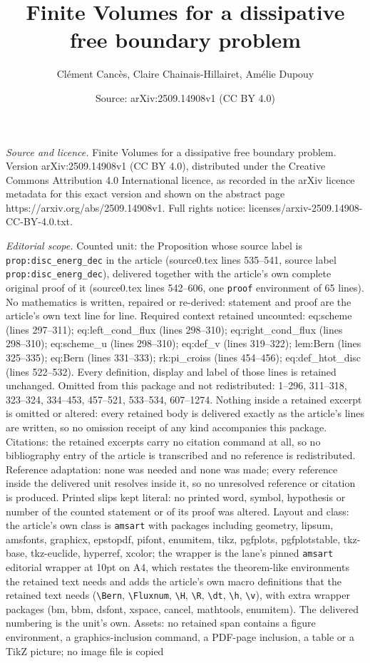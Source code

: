 \documentclass[10pt,a4paper]{amsart}
\title[Finite Volumes for a dissipative free boundary problem]{Finite Volumes for a dissipative free boundary problem}
\author{Cl\'ement Canc\`es, Claire Chainais-Hillairet, Am\'elie Dupouy}
\date{Source: arXiv:2509.14908v1 (CC BY 4.0)}
\begin{document}
\maketitle

\noindent\emph{Source and licence.} Finite Volumes for a dissipative free boundary problem. Version arXiv:2509.14908v1 (CC BY 4.0), distributed under the Creative Commons Attribution 4.0 International licence, as recorded in the arXiv licence metadata for this exact version and shown on the abstract page https://arxiv.org/abs/2509.14908v1. Full rights notice: licenses/arxiv-2509.14908-CC-BY-4.0.txt.\par\smallskip

\noindent\textit{Editorial scope.} Counted unit: the Proposition whose source label is \texttt{prop:disc\_energ\_dec} in the article (source0.tex lines 535--541, source label \texttt{prop:disc\_energ\_dec}), delivered together with the article's own complete original proof of it (source0.tex lines 542--606, one \texttt{proof} environment of 65 lines). No mathematics is written, repaired or re-derived: statement and proof are the article's own text line for line. Required context retained uncounted: eq:scheme (lines 297--311); eq:left\_cond\_flux (lines 298--310); eq:right\_cond\_flux (lines 298--310); eq:scheme\_u (lines 298--310); eq:def\_v (lines 319--322); lem:Bern (lines 325--335); eq:Bern (lines 331--333); rk:pi\_croiss (lines 454--456); eq:def\_htot\_disc (lines 522--532). Every definition, display and label of those lines is retained unchanged. Omitted from this package and not redistributed: 1--296, 311--318, 323--324, 334--453, 457--521, 533--534, 607--1274. Nothing inside a retained excerpt is omitted or altered: every retained body is delivered exactly as the article's lines are written, so no omission receipt of any kind accompanies this package. Citations: the retained excerpts carry no citation command at all, so no bibliography entry of the article is transcribed and no reference is redistributed. Reference adaptation: none was needed and none was made; every reference inside the delivered unit resolves inside it, so no unresolved reference or citation is produced. Printed slips kept literal: no printed word, symbol, hypothesis or number of the counted statement or of its proof was altered. Layout and class: the article's own class is \texttt{amsart} with packages including geometry, lipsum, amsfonts, graphicx, epstopdf, pifont, enumitem, tikz, pgfplots, pgfplotstable, tkz-base, tkz-euclide, hyperref, xcolor; the wrapper is the lane's pinned \texttt{amsart} editorial wrapper at 10pt on A4, which restates the theorem-like environments the retained text needs and adds the article's own macro definitions that the retained text needs (\texttt{\textbackslash Bern}, \texttt{\textbackslash Fluxnum}, \texttt{\textbackslash H}, \texttt{\textbackslash R}, \texttt{\textbackslash dt}, \texttt{\textbackslash h}, \texttt{\textbackslash v}), with extra wrapper packages (bm, bbm, dsfont, xspace, cancel, mathtools, enumitem). The delivered numbering is the unit's own. Assets: no retained span contains a figure environment, a graphics-inclusion command, a PDF-page inclusion, a table or a TikZ picture; no image file is copied 
\end{document}
